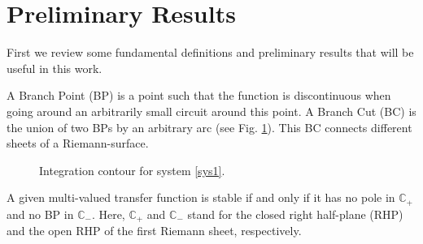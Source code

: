 \documentclass[twoside,reqno,11pt]{fcaa-var} %
\begin{document}
\section{Preliminary Results}
First we review some fundamental definitions and preliminary results that will be useful in this work.
\begin{definition}
	A Branch Point (BP) is a point such that the function is discontinuous when going around an arbitrarily small circuit around this point. A Branch Cut (BC) is the union of two BPs by an arbitrary arc (see Fig. \ref{contour1}). This BC connects different sheets of a Riemann-surface.
\end{definition}
\begin{figure}[h!]
	\centering
        
	\caption{Integration contour for system \eqref{sys1}.}\label{contour1}
\end{figure}
\begin{theorem} \label{th:th1}
	A given multi-valued transfer function is stable if and only if it has no pole in $\mathbb{C}_+$ and no BP in $\mathbb{C}_-$. Here, $\mathbb{C}_+$ and $\mathbb{C}_-$ stand for the closed right half-plane (RHP) and the open RHP of the first Riemann sheet, respectively.
\end{theorem}
\end{document}
